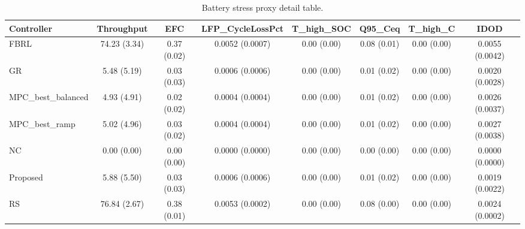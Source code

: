 \begin{table}[t]
\centering
\caption{Battery stress proxy detail table.}
\label{tab:stress_proxy_auto}
\begin{tabular}{lccccccc}
\toprule
Controller & Throughput & EFC & LFP\_CycleLossPct & T\_high\_SOC & Q95\_Ceq & T\_high\_C & IDOD \\
\midrule
FBRL & 74.23 (3.34) & 0.37 (0.02) & 0.0052 (0.0007) & 0.00 (0.00) & 0.08 (0.01) & 0.00 (0.00) & 0.0055 (0.0042) \\
GR & 5.48 (5.19) & 0.03 (0.03) & 0.0006 (0.0006) & 0.00 (0.00) & 0.01 (0.02) & 0.00 (0.00) & 0.0020 (0.0028) \\
MPC\_best\_balanced & 4.93 (4.91) & 0.02 (0.02) & 0.0004 (0.0004) & 0.00 (0.00) & 0.01 (0.02) & 0.00 (0.00) & 0.0026 (0.0037) \\
MPC\_best\_ramp & 5.02 (4.96) & 0.03 (0.02) & 0.0004 (0.0004) & 0.00 (0.00) & 0.01 (0.02) & 0.00 (0.00) & 0.0027 (0.0038) \\
NC & 0.00 (0.00) & 0.00 (0.00) & 0.0000 (0.0000) & 0.00 (0.00) & 0.00 (0.00) & 0.00 (0.00) & 0.0000 (0.0000) \\
Proposed & 5.88 (5.50) & 0.03 (0.03) & 0.0006 (0.0006) & 0.00 (0.00) & 0.01 (0.02) & 0.00 (0.00) & 0.0019 (0.0022) \\
RS & 76.84 (2.67) & 0.38 (0.01) & 0.0053 (0.0002) & 0.00 (0.00) & 0.08 (0.00) & 0.00 (0.00) & 0.0024 (0.0002) \\
\bottomrule
\end{tabular}
\end{table}